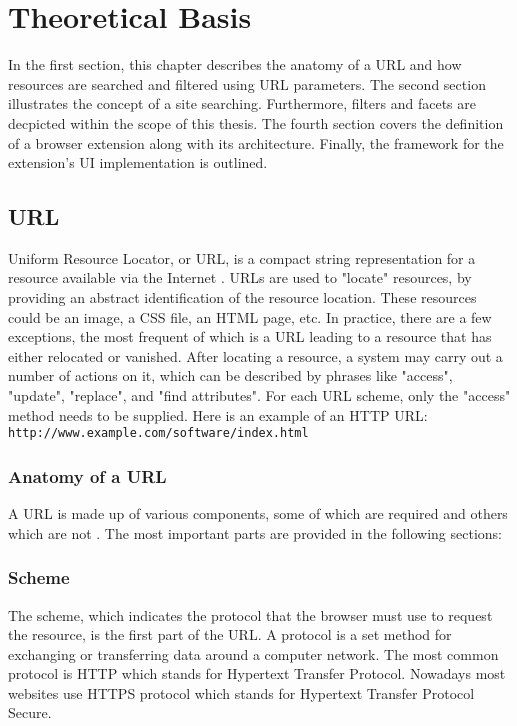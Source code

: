 \newpage
\chapter{Theoretical Basis}
In the first section, this chapter describes the anatomy of a URL and how resources are searched and filtered using URL parameters. The second section illustrates the concept of a site searching. Furthermore, filters and facets are decpicted within the scope of this thesis. The fourth section covers the definition of a browser extension along with its architecture. Finally, the framework for the extension's UI implementation is outlined.

\section{URL}
Uniform Resource Locator, or URL, is a compact string representation for a resource available via the Internet \autocite{berners1994uniform}. URLs are used to "locate" resources, by providing an abstract identification of the resource location. These resources could be an image, a CSS file, an HTML page, etc. In practice, there are a few exceptions, the most frequent of which is a URL leading to a resource that has either relocated or vanished. After locating a resource, a system may carry out a number of actions on it, which can be described by phrases like "access", "update", "replace", and "find attributes". For each URL scheme, only the "access" method needs to be supplied. Here is an example of an HTTP URL: \texttt{http://www.example.com/software/index.html}

\subsection{Anatomy of a URL}
\label{url_anatomy}
A URL is made up of various components, some of which are required and others which are not \autocite{mozilla2022url}. The most important parts are provided in the following sections:

\subsection*{Scheme}
The scheme, which indicates the protocol that the browser must use to request the resource, is the first part of the URL. A protocol is a set method for exchanging or transferring data around a computer network. The most common protocol is HTTP which stands for Hypertext Transfer Protocol. Nowadays most websites use HTTPS protocol which stands for Hypertext Transfer Protocol Secure.

